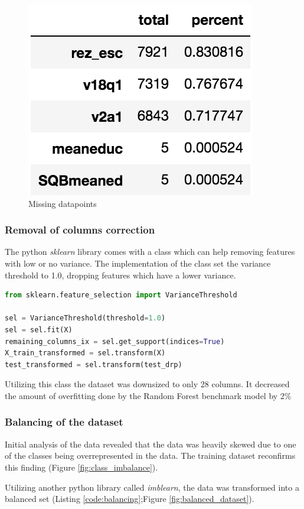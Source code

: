 \documentclass[preprint,12pt]{elsarticle}
\begin{document}
\begin{figure}[h]
\centering\includegraphics[width=0.4\linewidth]{missing_values}
\caption{Missing datapoints}
\label{fig:missing_datapoints}
\end{figure}

\subsubsection{Removal of columns correction}
\label{sss:removal}

The python \textit{sklearn} library comes with a class which can help removing features with low or no variance. The implementation of the class set the variance threshold to 1.0, dropping features which have a lower variance.

\begin{lstlisting}[language=python,label={code:feature_removal},caption={Using VarianceThreshold to remove features}]
from sklearn.feature_selection import VarianceThreshold

sel = VarianceThreshold(threshold=1.0)
sel = sel.fit(X)
remaining_columns_ix = sel.get_support(indices=True)
X_train_transformed = sel.transform(X)
test_transformed = sel.transform(test_drp)
\end{lstlisting}

Utilizing this class the dataset was downsized to only 28 columns. It decreased the amount of overfitting done by the Random Forest benchmark model by 2\%

\subsubsection{Balancing of the dataset}
\label{sss:balancing_dataset}

Initial analysis of the data revealed that the data was heavily skewed due to one of the classes being overrepresented in the data. The training dataset reconfirms this finding (Figure \ref{fig:class_imbalance}).

Utilizing another python library called \textit{imblearn}, the data was transformed into a balanced set (Listing \ref{code:balancing};Figure \ref{fig:balanced_dataset}).
\end{document}
